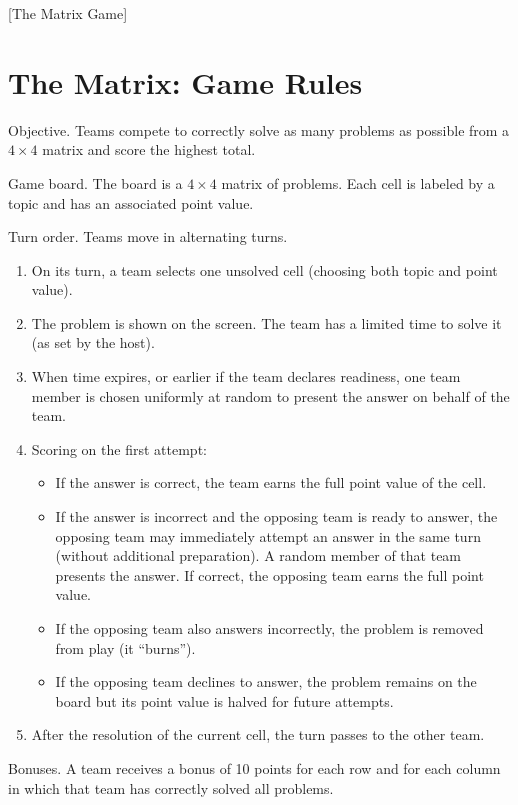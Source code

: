 [The Matrix Game]
    
\newpage

\section*{The Matrix: Game Rules}

Objective. Teams compete to correctly solve as many problems as possible from a $4\times 4$ matrix and score the highest total.

Game board. The board is a $4\times 4$ matrix of problems. Each cell is labeled by a topic and has an associated point value.

Turn order. Teams move in alternating turns.
\begin{enumerate}
\item On its turn, a team selects one unsolved cell (choosing both topic and point value).
\item The problem is shown on the screen. The team has a limited time to solve it (as set by the host).
\item When time expires, or earlier if the team declares readiness, one team member is chosen uniformly at random to present the answer on behalf of the team.
\item Scoring on the first attempt:
    \begin{itemize}
    \item If the answer is correct, the team earns the full point value of the cell.
    \item If the answer is incorrect and the opposing team is ready to answer, the opposing team may immediately attempt an answer in the same turn (without additional preparation). A random member of that team presents the answer. If correct, the opposing team earns the full point value.
    \item If the opposing team also answers incorrectly, the problem is removed from play (it “burns”).
    \item If the opposing team declines to answer, the problem remains on the board but its point value is halved for future attempts.
    \end{itemize}
\item After the resolution of the current cell, the turn passes to the other team.
\end{enumerate}

Bonuses. A team receives a bonus of 10 points for each row and for each column in which that team has correctly solved all problems.


